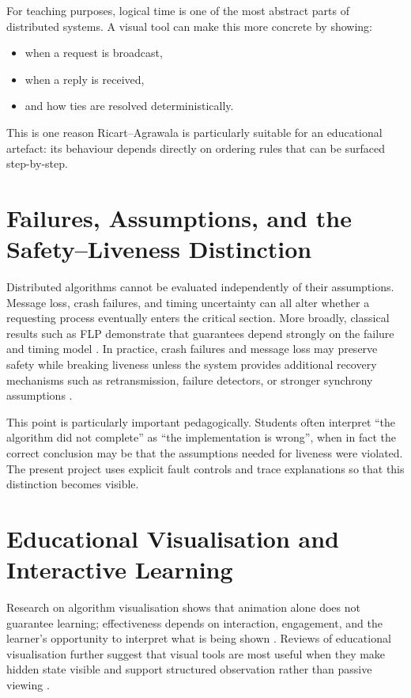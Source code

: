 For teaching purposes, logical time is one of the most abstract parts of distributed systems. A visual tool can make this more concrete by showing:
\begin{itemize}
  \item when a request is broadcast,
  \item when a reply is received,
  \item and how ties are resolved deterministically.
\end{itemize}

This is one reason Ricart--Agrawala is particularly suitable for an educational artefact: its behaviour depends directly on ordering rules that can be surfaced step-by-step.

\section{Failures, Assumptions, and the Safety--Liveness Distinction}
Distributed algorithms cannot be evaluated independently of their assumptions. Message loss, crash failures, and timing uncertainty can all alter whether a requesting process eventually enters the critical section. More broadly, classical results such as FLP demonstrate that guarantees depend strongly on the failure and timing model \cite{fischer1985impossibility}. In practice, crash failures and message loss may preserve safety while breaking liveness unless the system provides additional recovery mechanisms such as retransmission, failure detectors, or stronger synchrony assumptions \cite{chandra1996failure}.

This point is particularly important pedagogically. Students often interpret ``the algorithm did not complete'' as ``the implementation is wrong'', when in fact the correct conclusion may be that the assumptions needed for liveness were violated. The present project uses explicit fault controls and trace explanations so that this distinction becomes visible.

\section{Educational Visualisation and Interactive Learning}
Research on algorithm visualisation shows that animation alone does not guarantee learning; effectiveness depends on interaction, engagement, and the learner's opportunity to interpret what is being shown \cite{naps2002engagement,hundhausen2002meta}. Reviews of educational visualisation further suggest that visual tools are most useful when they make hidden state visible and support structured observation rather than passive viewing \cite{shaffer2010algoviz,sorva2013visual,tversky2002animation}.


